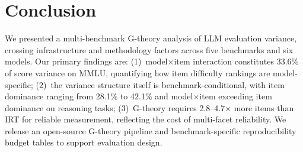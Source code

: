 \documentclass[11pt,letterpaper]{article}
\begin{document}
\section{Conclusion}

We presented a multi-benchmark G-theory analysis of LLM evaluation variance, crossing infrastructure and methodology factors across five benchmarks and six models. Our primary findings are: (1)~model$\times$item interaction constitutes 33.6\% of score variance on MMLU, quantifying how item difficulty rankings are model-specific; (2)~the variance structure itself is benchmark-conditional, with item dominance ranging from 28.1\% to 42.1\% and model$\times$item exceeding item dominance on reasoning tasks; (3)~G-theory requires 2.8--4.7$\times$ more items than IRT for reliable measurement, reflecting the cost of multi-facet reliability. We release an open-source G-theory pipeline and benchmark-specific reproducibility budget tables to support evaluation design.


\end{document}
